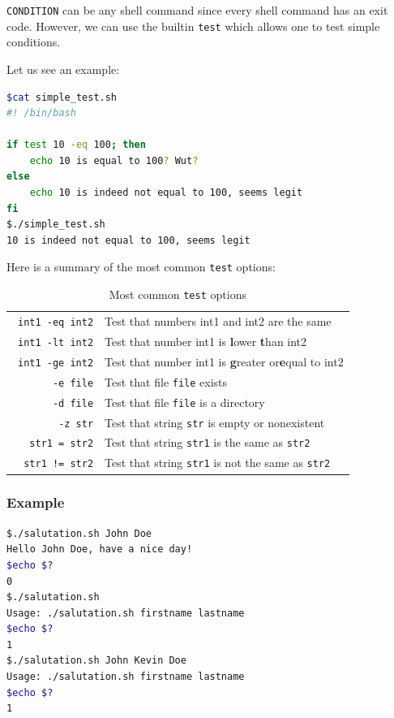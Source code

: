 \documentclass[12pt]{article}
\begin{document}
\texttt{CONDITION} can be any shell command since every shell command has an exit code. However, we can use the builtin \texttt{test} which allows one to test simple conditions.

Let us see an example:

\begin{lstlisting}[language=bash]
$cat simple_test.sh 
#! /bin/bash

if test 10 -eq 100; then
	echo 10 is equal to 100? Wut?
else
	echo 10 is indeed not equal to 100, seems legit
fi
$./simple_test.sh 
10 is indeed not equal to 100, seems legit
\end{lstlisting}

Here is a summary of the most common \texttt{test} options:

\begin{table}[ht]
\centering
\begin{tabular}[t]{rl}
\midrule\
\texttt{int1 -eq int2} &Test that numbers int1 and int2 are the same\\
\texttt{int1 -lt int2} &Test that number int1 is \textbf{l}ower \textbf{t}han int2\\
\texttt{int1 -ge int2} &Test that number int1 is \textbf{g}reater or\textbf{e}qual to int2\\
\texttt{-e file} &Test that file \texttt{file} exists\\
\texttt{-d file} &Test that file \texttt{file} is a directory\\
\texttt{-z str} &Test that string \texttt{str} is empty or nonexistent\\
\texttt{str1 = str2} &Test that string \texttt{str1} is the same as \texttt{str2}\\
\texttt{str1 != str2} &Test that string \texttt{str1} is not the same as \texttt{str2}\\

\bottomrule
\end{tabular}
\caption{Most common \texttt{test} options}
\end{table}%

\subsubsection{Example}

\begin{lstlisting}[language=bash]
$./salutation.sh John Doe
Hello John Doe, have a nice day!
$echo $?
0
$./salutation.sh 
Usage: ./salutation.sh firstname lastname
$echo $?
1
$./salutation.sh John Kevin Doe
Usage: ./salutation.sh firstname lastname
$echo $?
1
\end{lstlisting}
\end{document}
